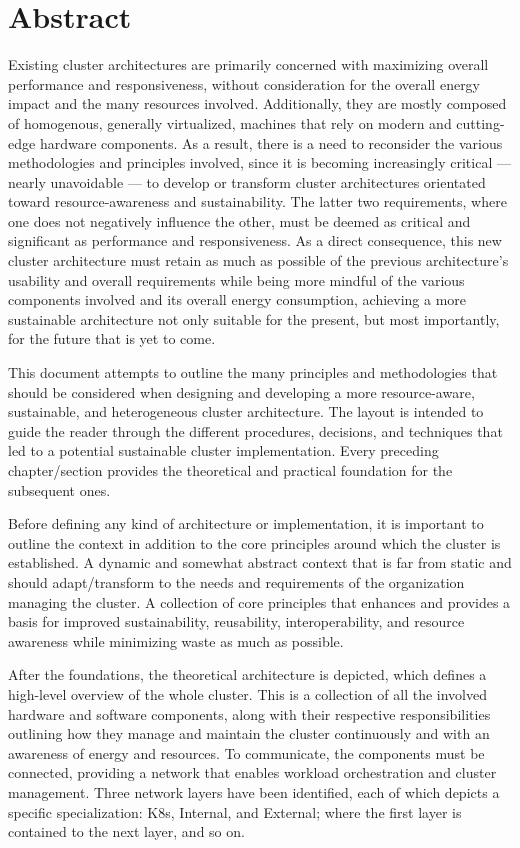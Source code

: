 \chapter*{Abstract}
\label{abtract}


Existing cluster architectures are primarily concerned with maximizing overall
performance and responsiveness, without consideration for the overall energy impact
and the many resources involved. Additionally, they are mostly composed of homogenous,
generally virtualized, machines that rely on modern and cutting-edge hardware components.
As a result, there is a need to reconsider the various methodologies and principles
involved, since it is becoming increasingly critical --- nearly unavoidable ---
to develop or transform cluster architectures orientated toward resource-awareness
and sustainability. The latter two requirements, where one does not negatively
influence the other, must be deemed as critical and significant as performance and
responsiveness. As a direct consequence, this new cluster architecture must retain
as much as possible of the previous architecture's usability and overall requirements
while being more mindful of the various components involved and its overall energy
consumption, achieving a more sustainable architecture not only suitable for the
present, but most importantly, for the future that is yet to come.

This document attempts to outline the many principles and methodologies that
should be considered when designing and developing a more resource-aware, sustainable,
and heterogeneous cluster architecture. The layout is intended to guide the reader
through the different procedures, decisions, and techniques that led to a potential
sustainable cluster implementation. Every preceding chapter/section provides the
theoretical and practical foundation for the subsequent ones.

Before defining any kind of architecture or implementation, it is important to outline
the context in addition to the core principles around which the cluster is established.
A dynamic and somewhat abstract context that is far from static and should adapt/transform
to the needs and requirements of the organization managing the cluster. A collection
of core principles that enhances and provides a basis for improved sustainability,
reusability, interoperability, and resource awareness while minimizing waste as
much as possible.

After the foundations, the theoretical architecture is depicted, which defines a
high-level overview of the whole cluster. This is a collection of all the involved
hardware and software components, along with their respective responsibilities
outlining how they manage and maintain the cluster continuously and with an
awareness of energy and resources. To communicate, the components must be
connected, providing a network that enables workload orchestration and cluster management.
Three network layers have been identified, each of which depicts a specific specialization:
K8s, Internal, and External; where the first layer is contained to the next layer,
and so on.

